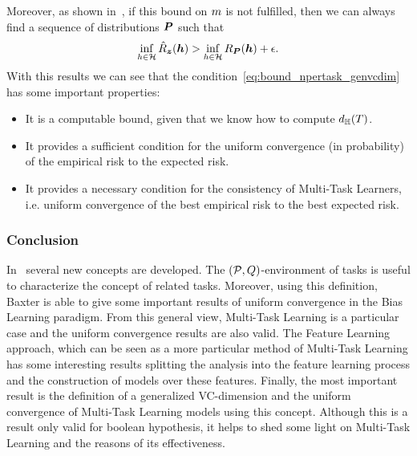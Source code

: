 Moreover, as shown in~\cite[Theorem~14]{baxter2000model}, if this bound on $m$ is not fulfilled, then we can always find a sequence of distributions $\bm{P}$ such that
\begin{equation}
    \nonumber
    \inf_{h \in \mathcal{H}} \hat{R}_{\bm{z}}(\bm{h}) > \inf_{h \in \mathcal{H}} R_{\bm{P}}(\bm{h}) + \epsilon .
\end{equation}
With this results we can see that the condition~\eqref{eq:bound_npertask_genvcdim} has some important properties:
\begin{itemize}
    \item It is a computable bound, given that we know how to compute $d_{\mathbb{H}}(T)$.
    \item It provides a sufficient condition for the uniform convergence (in probability) of the empirical risk to the expected risk.
    \item It provides a necessary condition for the consistency of Multi-Task Learners, i.e. uniform convergence of the best empirical risk to the best expected risk.
\end{itemize}

\subsubsection*{Conclusion}
In~\cite{baxter2000model} several new concepts are developed. The $(\mathcal{P}, Q)$-environment of tasks is useful to characterize the concept of related tasks. Moreover, using this definition, Baxter is able to give some important results of uniform convergence in the Bias Learning paradigm. From this general view, Multi-Task Learning
is a particular case and the uniform convergence results are also valid. The Feature Learning approach, which can be seen as a more particular method of Multi-Task Learning has some interesting results splitting the analysis into the feature learning process and the construction of models over these features. Finally, the most important result is the definition of a generalized VC-dimension and the uniform convergence of Multi-Task Learning models using this concept. Although this is a result only valid for boolean hypothesis, it helps to shed some light on Multi-Task Learning and the reasons of its effectiveness.

